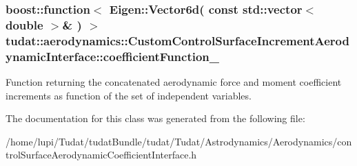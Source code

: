 \subsubsection[{\texorpdfstring{coefficient\+Function\+\_\+}{coefficientFunction_}}]{\setlength{\rightskip}{0pt plus 5cm}boost\+::function$<$ Eigen\+::\+Vector6d( const std\+::vector$<$ double $>$\& ) $>$ tudat\+::aerodynamics\+::\+Custom\+Control\+Surface\+Increment\+Aerodynamic\+Interface\+::coefficient\+Function\+\_\+\hspace{0.3cm}{\ttfamily [protected]}}\hypertarget{classtudat_1_1aerodynamics_1_1CustomControlSurfaceIncrementAerodynamicInterface_aeb14a5bff5abbf9653de56b75be92ebb}{}\label{classtudat_1_1aerodynamics_1_1CustomControlSurfaceIncrementAerodynamicInterface_aeb14a5bff5abbf9653de56b75be92ebb}
Function returning the concatenated aerodynamic force and moment coefficient increments as function of the set of independent variables. 

The documentation for this class was generated from the following file\+:\begin{DoxyCompactItemize}
\item 
/home/lupi/\+Tudat/tudat\+Bundle/tudat/\+Tudat/\+Astrodynamics/\+Aerodynamics/control\+Surface\+Aerodynamic\+Coefficient\+Interface.\+h\end{DoxyCompactItemize}
